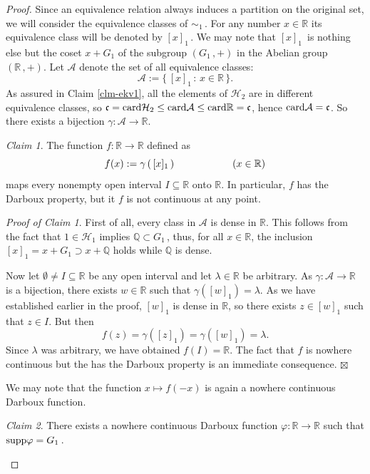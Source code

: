 \documentclass[12pt]{amsart}
\theoremstyle{remark}
\newtheorem{claim}{Claim}
\newtheorem{prclm}{Proof of Claim}
\theoremstyle{definition}
\newcommand{\dlth}{\mathcal{H}}
\newcommand{\dlta}{\mathcal{A}}
\newcommand{\QQ}{\mathbb{Q}}
\newcommand{\RR}{\mathbb{R}}
\newcommand{\cnc}{\mathfrak{c}}
\newcommand{\card}{\mbox{\rm card}}
\newcommand{\supp}{\mbox{\rm supp}}
\newcommand{\map}{\longrightarrow}
\begin{document}
\begin{proof}
Since an equivalence relation always induces a partition on the 
original set, we will consider the equivalence classes 
of $ \sim_1 \,$. 
For any number $ x \in \RR $ its equivalence 
class will be denoted by $ [x]_1 \,$. 
We may note that $ [x]_1 \,$ is 
nothing else but the coset 
$ x + G_1 $ of the subgroup 
$ \left( G_1 \,, + \right) $ 
in the Abelian group $ \left( \RR \,, + \right) $. 
Let $ \dlta $ denote the set of all equivalence classes: 
\[
\dlta := \lbrace \, [x]_1 \, : \, x \in \RR \, \rbrace. 
\]
As assured in Claim \ref{clm-ekv1}, 
all the elements of $ \dlth_2 $ are 
in different equivalence classes, so 
$ \cnc = \card \dlth_2 \leq \card \dlta 
\leq \card \RR = \cnc $, hence 
$ \card \dlta = \cnc $. So there exists a bijection 
$ \gamma : \dlta \map \RR $. 

\begin{claim}\label{clm-Drbx1}
The function $ f : \RR \map \RR $  defined as 
\[
f(x) := \gamma \left( \, [x]_1 \, \right) 
\hspace{20mm} ( x \in \RR ) 
\] 
maps every nonempty open interval $ I \subseteq \RR $ 
onto $ \RR $. In particular, $ f $ has the 
Darboux property, but it $ f$ is not continuous 
at any point. 
\end{claim} 

\begin{prclm}
First of all, every class in $ \dlta $ is dense in $ \RR $. 
This follows from the fact that 
$ 1 \in \dlth_1 $ implies $ \QQ \subset G_1 \,$, 
thus, for all $ x \in \RR $, the inclusion 
$ [x]_1 = x + G_1 \supset x + \QQ $ holds while 
$ \QQ $ is dense. 

Now let $ \emptyset \neq I \subseteq \RR $ be 
any open interval and let 
$ \lambda \in \RR $ be arbitrary. 
As $ \gamma : \dlta \map \RR $ is a bijection, 
there exists $ w \in \RR $ such that 
$ \gamma \left( [w]_1 \right) = \lambda $. 
As we have established earlier in the proof, 
$ [w]_1 $ is dense in $ \RR $, 
so there exists $ z \in [w]_1 $ 
such that $ z \in I $. 
But then 
\[
f(z) = \gamma \left( [z]_1 \right) = 
\gamma \left( [w]_1 \right) = \lambda. 
\]
Since $ \lambda $ was arbitrary, 
we have obtained $ f(I) = \RR $. 
The fact that $ f $ is nowhere continuous but the 
has the Darboux property is an immediate consequence. 
\hfill $ \boxtimes $ 
\end{prclm}

We may note that the function 
$x \mapsto f(-x)$ is again a nowhere continuous 
Darboux function. 

\begin{claim}\label{clm-Drbx2}
There exists a nowhere continuous Darboux function 
$ \varphi : \RR \map\RR $ such that 
$ \supp \varphi = G_1 \,$. 
\end{claim} 


\end{proof}
\end{document}
